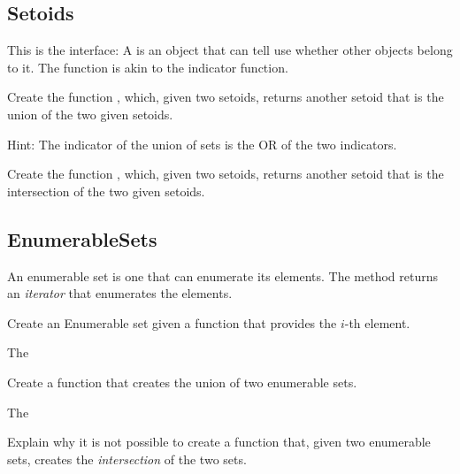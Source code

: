 \subsection{Setoids}

This is the \Setoid interface:
%
%
A \Setoid is an object that can tell use whether other objects belong to it.
The  function is akin to the indicator function.

\begin{codeexercise}
    Create the function , which, given two setoids, returns another setoid that is the union of the two given setoids.

    Hint: The indicator of the union of sets is the OR of the two indicators.
\end{codeexercise}

\begin{codeexercise}
    Create the function , which, given two setoids, returns another setoid that is the intersection of the two given setoids.
\end{codeexercise}


\subsection{EnumerableSets}

%
An enumerable set is one that can enumerate its elements.
The method  returns an \emph{iterator} that enumerates the elements.

\begin{codeexercise}
    Create an Enumerable set given a function that provides the $i$-th element.

    The
\end{codeexercise}

\begin{codeexercise}
    Create a function that creates the union of two enumerable sets.

    The
\end{codeexercise}

\begin{codeexercise}
    Explain why it is not possible to create a function that, given two enumerable sets,
    creates the \emph{intersection} of the two sets.
\end{codeexercise}
